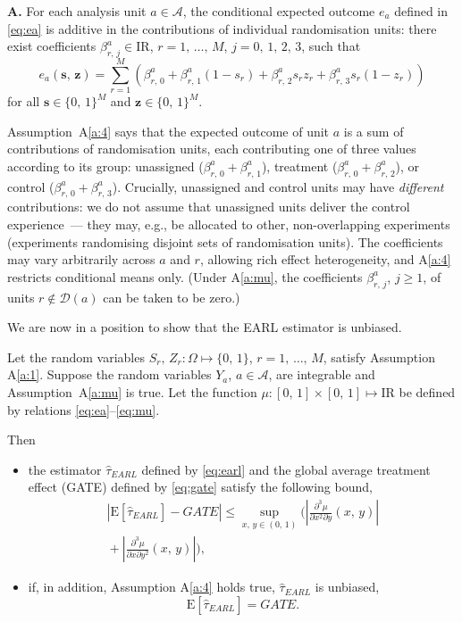\documentclass[sigconf,anonymous,review]{acmart}
\newcounter{assumption}
\newenvironment{assumption}{\refstepcounter{assumption}\par\medskip\noindent\textbf{A\theassumption.}\enspace}{\par\medskip}
\newcommand{\E}{\mathrm E}
\newcommand{\R}{\mathrm{I}\!\mathrm{R}}
\newcommand{\nn}{\nonumber}
\begin{document}
\begin{assumption}\label{a:4}
For each analysis unit $a\in\mathcal{A}$, the conditional expected outcome $e_a$ defined in \eqref{eq:ea} is additive in the contributions of individual randomisation units: there exist coefficients $\beta^a_{r,\,j}\in\R$, $r=1,\,\ldots,\,M$, $j=0,\,1,\,2,\,3$, such that
\begin{equation*}
    e_a(\textbf{s},\,\textbf{z}) = \sum_{r=1}^M\left(\beta^a_{r,\,0}+\beta^a_{r,\,1}(1-s_r)+\beta^a_{r,\,2}s_rz_r+\beta^a_{r,\,3}s_r(1-z_r)\right)
\end{equation*}
for all $\textbf{s}\in\{0,\,1\}^M$ and $\textbf{z}\in\{0,\,1\}^M$.
\end{assumption}
Assumption~A\ref{a:4} says that the expected outcome of unit $a$ is a sum of contributions of randomisation units, each contributing one of three values according to its group: unassigned ($\beta^a_{r,\,0}+\beta^a_{r,\,1}$), treatment ($\beta^a_{r,\,0}+\beta^a_{r,\,2}$), or control ($\beta^a_{r,\,0}+\beta^a_{r,\,3}$). Crucially, unassigned and control units may have \emph{different} contributions: we do not assume that unassigned units deliver the control experience~--- they may, e.g., be allocated to other, non-overlapping experiments (experiments randomising disjoint sets of randomisation units). The coefficients may vary arbitrarily across $a$ and $r$, allowing rich effect heterogeneity, and A\ref{a:4} restricts conditional means only. (Under A\ref{a:mu}, the coefficients $\beta^a_{r,\,j}$, $j\ge 1$, of units $r\notin\mathcal D(a)$ can be taken to be zero.)

We are now in a position to show that the EARL estimator is unbiased.
\begin{theorem}\label{th:unbiasedness}
    Let the random variables $S_r,\,Z_r\colon\Omega\mapsto\{0,\,1\}$, $r=1,\,\ldots,\,M$, satisfy Assumption A\ref{a:1}. Suppose the random variables $Y_a$, $a\in\mathcal A$, are integrable and Assumption~A\ref{a:mu} is true. Let the function $\mu\colon[0,\,1]\times[0,\,1]\mapsto\R$ be defined by relations \eqref{eq:ea}--\eqref{eq:mu}.

    Then
    \begin{itemize}
    \item[\textup{(a)}] the estimator $\hat\tau_{EARL}$ defined by \eqref{eq:earl} and the global average treatment effect (GATE) defined by \eqref{eq:gate} satisfy the following bound,
    \begin{eqnarray}\label{eq:bound}
        \left|\E[\hat\tau^{\phantom{1}}_{EARL}] - GATE\right| \le \sup_{x,\,y\in(0,\,1)}\Bigg(\left|\frac{\partial^3\mu}{\partial x^2\partial y}(x,\,y)\right| \nn\\ {}+ \left|\frac{\partial^3\mu}{\partial  x\partial y^2}(x,\,y)\right|\Bigg),
    \end{eqnarray}
    \item[\textup{(b)}] if, in addition, Assumption A\ref{a:4} holds true, $\hat \tau_{EARL}$ is unbiased,
    \begin{equation}\label{eq:unbiasedness}
        \E[\hat\tau^{\phantom{1}}_{EARL}] = GATE.
    \end{equation}
    \end{itemize}
\end{theorem}
\end{document}
